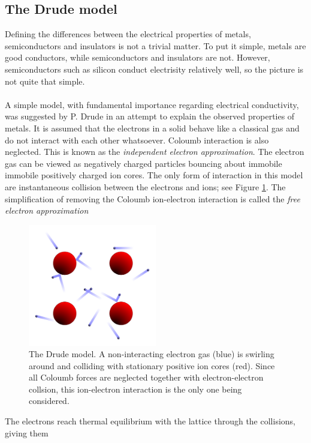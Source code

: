 \subsection{\textbf{The Drude model} \cite{Hofmann} }
Defining the differences between the electrical properties of metals, semiconductors and insulators
is not a trivial matter. To put it simple, metals are good conductors, while semiconductors and 
insulators are not. However, semiconductors such as silicon conduct electrisity relatively well,
so the picture is not quite that simple.
\\
\\
A simple model, with fundamental importance regarding electrical conductivity, was suggested by
P. Drude in an attempt to explain the observed properties of metals. It is assumed that the 
electrons in a solid behave like a classical gas and do not interact with each other whatsoever.
Coloumb interaction is also neglected. This is known as the \textit{independent electron approximation}. 
The electron gas can be viewed as negatively charged particles bouncing about
immobile immobile positively charged ion cores. The only form of interaction in this model
are instantaneous collision between the electrons and ions; see Figure \ref{fig:DrudeModel}. 
The simplification of removing the Coloumb ion-electron interaction is called the 
\textit{free electron approximation}
%
\begin{figure}[h!]
  \centering
   \includegraphics[width=0.5\textwidth]{Figures/DrudeModel.pdf}
   \caption{ 
      The Drude model. A non-interacting electron gas (blue) is swirling around and colliding with 
      stationary positive ion cores (red). 
      Since all Coloumb forces are neglected together with electron-electron
      collsion, this ion-electron interaction is the only one being considered.
   }
   \label{fig:DrudeModel}
\end{figure}
%
The electrons reach thermal equilibrium with the lattice through the collisions, giving them
